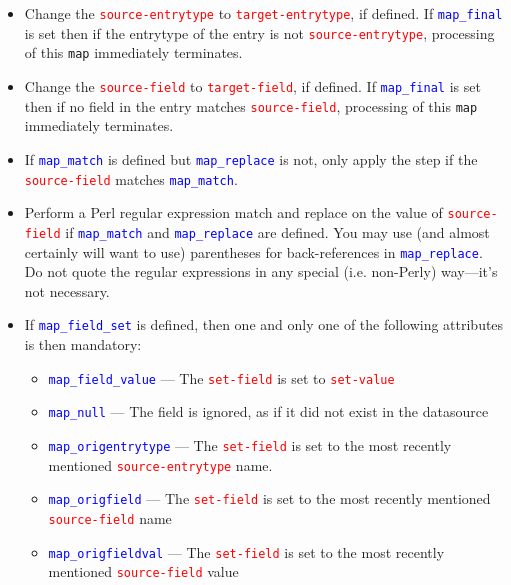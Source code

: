 \documentclass{ltxdockit}
\begin{document}
\begin{itemize}
\item Change the \textcolor{red}{\texttt{source-entrytype}} to
  \textcolor{red}{\texttt{target-entrytype}}, if defined. If
  \textcolor{blue}{\texttt{map\_final}} is set then if the entrytype of the
  entry is not \textcolor{red}{\texttt{source-entrytype}}, processing of
  this \verb+map+ immediately terminates.
\item Change the \textcolor{red}{\texttt{source-field}} to
  \textcolor{red}{\texttt{target-field}}, if defined. If
  \textcolor{blue}{\texttt{map\_final}} is set then if no field in the entry
  matches \textcolor{red}{\texttt{source-field}}, processing of
  this \verb+map+ immediately terminates.
\item If \textcolor{blue}{\texttt{map\_match}} is defined but
  \textcolor{blue}{\texttt{map\_replace}} is not, only apply the
  step if the \textcolor{red}{\texttt{source-field}} matches
  \textcolor{blue}{\texttt{map\_match}}.
\item Perform a Perl regular expression match and replace on the value of
  \textcolor{red}{\texttt{source-field}} if
  \textcolor{blue}{\texttt{map\_match}} and
  \textcolor{blue}{\texttt{map\_replace}} are defined. You may use (and almost certainly
  will want to use) parentheses for back-references in \textcolor{blue}{\texttt{map\_replace}}.
  Do not quote the regular expressions in any special (i.e. non-Perly) way---it's not
  necessary.
\item If \textcolor{blue}{\texttt{map\_field\_set}} is defined,
  then one and only one of the following attributes is then mandatory:
  \begin{itemize}
    \item \textcolor{blue}{\texttt{map\_field\_value}} --- The
      \textcolor{red}{\texttt{set-field}} is set to
      \textcolor{red}{\texttt{set-value}}
    \item \textcolor{blue}{\texttt{map\_null}} --- The field is ignored, as
      if it did not exist in the datasource
    \item \textcolor{blue}{\texttt{map\_origentrytype}} --- The
      \textcolor{red}{\texttt{set-field}} is set to the
      most recently mentioned \textcolor{red}{\texttt{source-entrytype}} name.
    \item \textcolor{blue}{\texttt{map\_origfield}} --- The
      \textcolor{red}{\texttt{set-field}} is set to the most recently
      mentioned \textcolor{red}{\texttt{source-field}} name
    \item \textcolor{blue}{\texttt{map\_origfieldval}} --- The
      \textcolor{red}{\texttt{set-field}} is set to the most recently
      mentioned \textcolor{red}{\texttt{source-field}} value
  \end{itemize}
\end{itemize}
\end{document}
